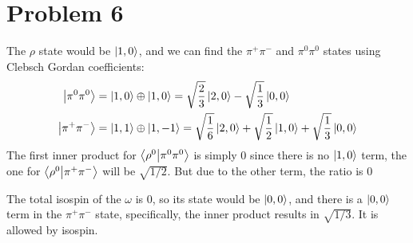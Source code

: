 \documentclass[12pt]{article}
\newcommand{\ppls}{\ket{1,1}}
\newcommand{\pzro}{\ket{1,0}}
\newcommand{\pmin}{\ket{1,-1}}
\begin{document}
\section*{Problem 6}
The $\rho$ state would be $\ket{1,0}$, and we can find the $\pi^+\pi^-$ and $\pi^0\pi^0$ states using Clebsch Gordan coefficients:
\begin{align*}
  \ket{\pi^0\pi^0}&=\pzro\oplus\pzro=\sqrt{\frac{2}{3}}\ket{2,0}
  -\sqrt{\frac{1}{3}}\ket{0,0}\\
  \ket{\pi^+\pi^-}&=\ppls\oplus\pmin=\sqrt{\frac{1}{6}}\ket{2,0}+
  \sqrt{\frac{1}{2}}\ket{1,0}+\sqrt{\frac{1}{3}}\ket{0,0}
\end{align*}
The first inner product for $\ip{\rho^0}{\pi^0\pi^0}$ is simply $0$ since there is no $\ket{1,0}$ term, the one for $\ip{\rho^0}{\pi^+\pi^-}$ will be $\sqrt{1/2}$. But due to the other term, the ratio is $0$

The total isospin of the $\omega$ is 0, so its state would be $\ket{0,0}$, and there is a $\ket{0,0}$ term in the $\pi^+\pi^-$ state, specifically, the inner product results in $\sqrt{1/3}$. It is allowed by isospin.
\end{document}
